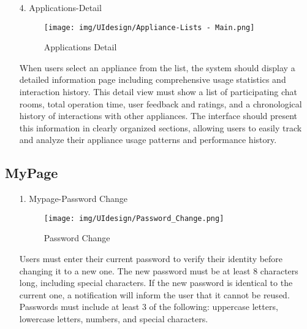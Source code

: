 \documentclass[conference]{IEEEtran}
\begin{document}
\begin{enumerate}
\begin{itemize}
\begin{itemize}
\begin{enumerate}
\begin{enumerate}
    \item[4.] Applications-Detail
    \begin{figure}[h]
        {\centering
        \hspace{4cm}
        \begin{minipage}{0.4\columnwidth}
            \texttt{[image: img/UIdesign/Appliance-Lists - Main.png]}
            \caption{Applications Detail}
        \end{minipage}}
    \end{figure}

    When users select an appliance from the list, the system should display a detailed information page including comprehensive usage statistics and interaction history. This detail view must show a list of participating chat rooms, total operation time, user feedback and ratings, and a chronological history of interactions with other appliances. The interface should present this information in clearly organized sections, allowing users to easily track and analyze their appliance usage patterns and performance history. \\ 
\end{enumerate}

    
\subsection{MyPage}

\begin{enumerate}
    \item[1.] Mypage-Password Change
    \begin{figure}[h]
        {\centering
        \hspace{4cm}
        \begin{minipage}{0.4\columnwidth}
            \texttt{[image: img/UIdesign/Password\_Change.png]}
            \caption{Password Change}
        \end{minipage}}
    \end{figure}

    Users must enter their current password to verify their identity before changing it to a new one. The new password must be at least 8 characters long, including special characters. If the new password is identical to the current one, a notification will inform the user that it cannot be reused. Passwords must include at least 3 of the following: uppercase letters, lowercase letters, numbers, and special characters. \\ \\ \\ \\
\end{enumerate}


\end{enumerate}
\end{itemize}
\end{itemize}
\end{enumerate}
\end{document}
